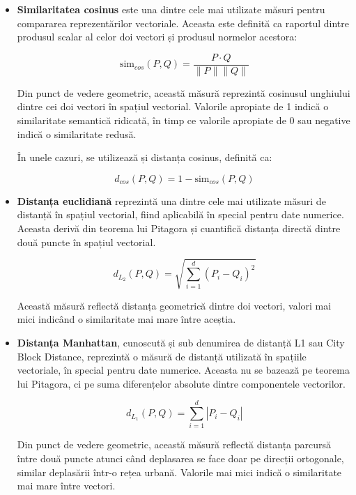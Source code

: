 \documentclass[12pt, a4paper, oneside, romanian]{teza-upb}
\begin{document}
\begin{itemize}
    \item\textbf{Similaritatea cosinus} este una dintre cele mai utilizate măsuri pentru compararea reprezentărilor vectoriale. Aceasta este definită ca raportul dintre produsul scalar al celor doi vectori și produsul normelor acestora:

\begin{equation}
\text{sim}_{cos}(P, Q) = \frac{P \cdot Q}{\|P\| \|Q\|}
\end{equation}

Din punct de vedere geometric, această măsură reprezintă cosinusul unghiului dintre cei doi vectori în spațiul vectorial. Valorile apropiate de 1 indică o similaritate semantică ridicată, în timp ce valorile apropiate de 0 sau negative indică o similaritate redusă. 

În unele cazuri, se utilizează și distanța cosinus, definită ca:

\begin{equation}
d_{cos}(P, Q) = 1 - \text{sim}_{cos}(P, Q)
\end{equation} 

    \item\textbf{Distanța euclidiană} reprezintă una dintre cele mai utilizate măsuri de distanță în spațiul vectorial, fiind aplicabilă în special pentru date numerice. Aceasta derivă din teorema lui Pitagora și cuantifică distanța directă dintre două puncte în spațiul vectorial.

\begin{equation}
d_{L_2}(P, Q) = \sqrt{\sum_{i=1}^{d} (P_i - Q_i)^2}
\end{equation}

Această măsură reflectă distanța geometrică dintre doi vectori, valori mai mici indicând o similaritate mai mare între aceștia.


\item\textbf{Distanța Manhattan}, cunoscută și sub denumirea de distanță L1 sau City Block Distance, reprezintă o măsură de distanță utilizată în spațiile vectoriale, în special pentru date numerice. Aceasta nu se bazează pe teorema lui Pitagora, ci pe suma diferențelor absolute dintre componentele vectorilor.

\begin{equation}
d_{L_1}(P, Q) = \sum_{i=1}^{d} |P_i - Q_i|
\end{equation}

Din punct de vedere geometric, această măsură reflectă distanța parcursă între două puncte atunci când deplasarea se face doar pe direcții ortogonale, similar deplasării într-o rețea urbană. Valorile mai mici indică o similaritate mai mare între vectori.


\end{itemize}
\end{document}
